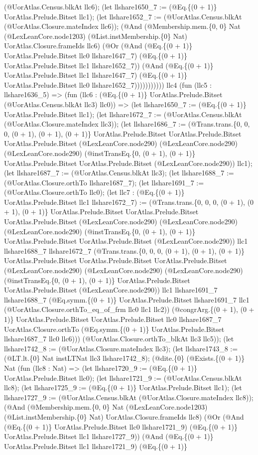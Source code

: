 \documentclass[11pt]{article}
\begin{document}
(@UorAtlas.Census.blkAt llc6); (let llshare1650\_7 := (@Eq.\{(0 + 1)\} UorAtlas.Prelude.Bitset llc1); (let llshare1652\_7 := (@UorAtlas.Census.blkAt (@UorAtlas.Closure.mateIndex llc6)); (@And (@Membership.mem.\{0, 0\} Nat (@LexLeanCore.node1203) (@List.instMembership.\{0\} Nat) UorAtlas.Closure.frameIds llc6) (@Or (@And (@Eq.\{(0 + 1)\} UorAtlas.Prelude.Bitset llc0 llshare1647\_7) (@Eq.\{(0 + 1)\} UorAtlas.Prelude.Bitset llc1 llshare1652\_7)) (@And (@Eq.\{(0 + 1)\} UorAtlas.Prelude.Bitset llc1 llshare1647\_7) (@Eq.\{(0 + 1)\} UorAtlas.Prelude.Bitset llc0 llshare1652\_7))))))))))) llc4 (fun (llc5 : llshare1636\_5) => (fun (llc6 : (@Eq.\{(0 + 1)\} UorAtlas.Prelude.Bitset (@UorAtlas.Census.blkAt llc3) llc0)) => (let llshare1650\_7 := (@Eq.\{(0 + 1)\} UorAtlas.Prelude.Bitset llc1); (let llshare1672\_7 := (@UorAtlas.Census.blkAt (@UorAtlas.Closure.mateIndex llc3)); (let llshare1686\_7 := (@Trans.trans.\{0, 0, 0, (0 + 1), (0 + 1), (0 + 1)\} UorAtlas.Prelude.Bitset UorAtlas.Prelude.Bitset UorAtlas.Prelude.Bitset (@LexLeanCore.node290) (@LexLeanCore.node290) (@LexLeanCore.node290) (@instTransEq.\{0, (0 + 1), (0 + 1)\} UorAtlas.Prelude.Bitset UorAtlas.Prelude.Bitset (@LexLeanCore.node290)) llc1); (let llshare1687\_7 := (@UorAtlas.Census.blkAt llc3); (let llshare1688\_7 := (@UorAtlas.Closure.orthTo llshare1687\_7); (let llshare1691\_7 := (@UorAtlas.Closure.orthTo llc0); (let llc7 : (@Eq.\{(0 + 1)\} UorAtlas.Prelude.Bitset llc1 llshare1672\_7) := (@Trans.trans.\{0, 0, 0, (0 + 1), (0 + 1), (0 + 1)\} UorAtlas.Prelude.Bitset UorAtlas.Prelude.Bitset UorAtlas.Prelude.Bitset (@LexLeanCore.node290) (@LexLeanCore.node290) (@LexLeanCore.node290) (@instTransEq.\{0, (0 + 1), (0 + 1)\} UorAtlas.Prelude.Bitset UorAtlas.Prelude.Bitset (@LexLeanCore.node290)) llc1 llshare1688\_7 llshare1672\_7 (@Trans.trans.\{0, 0, 0, (0 + 1), (0 + 1), (0 + 1)\} UorAtlas.Prelude.Bitset UorAtlas.Prelude.Bitset UorAtlas.Prelude.Bitset (@LexLeanCore.node290) (@LexLeanCore.node290) (@LexLeanCore.node290) (@instTransEq.\{0, (0 + 1), (0 + 1)\} UorAtlas.Prelude.Bitset UorAtlas.Prelude.Bitset (@LexLeanCore.node290)) llc1 llshare1691\_7 llshare1688\_7 (@Eq.symm.\{(0 + 1)\} UorAtlas.Prelude.Bitset llshare1691\_7 llc1 (@UorAtlas.Closure.orthTo\_eq\_of\_frm llc0 llc1 llc2)) (@congrArg.\{(0 + 1), (0 + 1)\} UorAtlas.Prelude.Bitset UorAtlas.Prelude.Bitset llc0 llshare1687\_7 UorAtlas.Closure.orthTo (@Eq.symm.\{(0 + 1)\} UorAtlas.Prelude.Bitset llshare1687\_7 llc0 llc6))) (@UorAtlas.Closure.orthTo\_blkAt llc3 llc5)); (let llshare1742\_8 := (@UorAtlas.Closure.mateIndex llc3); (let llshare1743\_8 := (@LT.lt.\{0\} Nat instLTNat llc3 llshare1742\_8); (@dite.\{0\} (@Exists.\{(0 + 1)\} Nat (fun (llc8 : Nat) => (let llshare1720\_9 := (@Eq.\{(0 + 1)\} UorAtlas.Prelude.Bitset llc0); (let llshare1721\_9 := (@UorAtlas.Census.blkAt llc8); (let llshare1725\_9 := (@Eq.\{(0 + 1)\} UorAtlas.Prelude.Bitset llc1); (let llshare1727\_9 := (@UorAtlas.Census.blkAt (@UorAtlas.Closure.mateIndex llc8)); (@And (@Membership.mem.\{0, 0\} Nat (@LexLeanCore.node1203) (@List.instMembership.\{0\} Nat) UorAtlas.Closure.frameIds llc8) (@Or (@And (@Eq.\{(0 + 1)\} UorAtlas.Prelude.Bitset llc0 llshare1721\_9) (@Eq.\{(0 + 1)\} UorAtlas.Prelude.Bitset llc1 llshare1727\_9)) (@And (@Eq.\{(0 + 1)\} UorAtlas.Prelude.Bitset llc1 llshare1721\_9) (@Eq.\{(0 + 1)\} 
\end{document}
